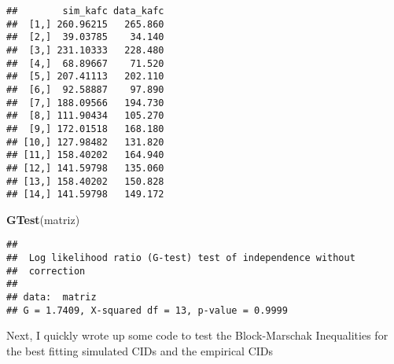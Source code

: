 \documentclass[]{article}
\newenvironment{Shaded}{\begin{snugshade}}{\end{snugshade}}
\newcommand{\KeywordTok}[1]{\textcolor[rgb]{0.13,0.29,0.53}{\textbf{#1}}}
\newcommand{\NormalTok}[1]{#1}
\begin{document}
\begin{verbatim}
##        sim_kafc data_kafc
##  [1,] 260.96215   265.860
##  [2,]  39.03785    34.140
##  [3,] 231.10333   228.480
##  [4,]  68.89667    71.520
##  [5,] 207.41113   202.110
##  [6,]  92.58887    97.890
##  [7,] 188.09566   194.730
##  [8,] 111.90434   105.270
##  [9,] 172.01518   168.180
## [10,] 127.98482   131.820
## [11,] 158.40202   164.940
## [12,] 141.59798   135.060
## [13,] 158.40202   150.828
## [14,] 141.59798   149.172
\end{verbatim}

\begin{Shaded}
\begin{Highlighting}[]
\KeywordTok{GTest}\NormalTok{(matriz)}
\end{Highlighting}
\end{Shaded}

\begin{verbatim}
## 
##  Log likelihood ratio (G-test) test of independence without
##  correction
## 
## data:  matriz
## G = 1.7409, X-squared df = 13, p-value = 0.9999
\end{verbatim}

Next, I quickly wrote up some code to test the Block-Marschak
Inequalities for the best fitting simulated CIDs and the empirical CIDs
\end{document}
